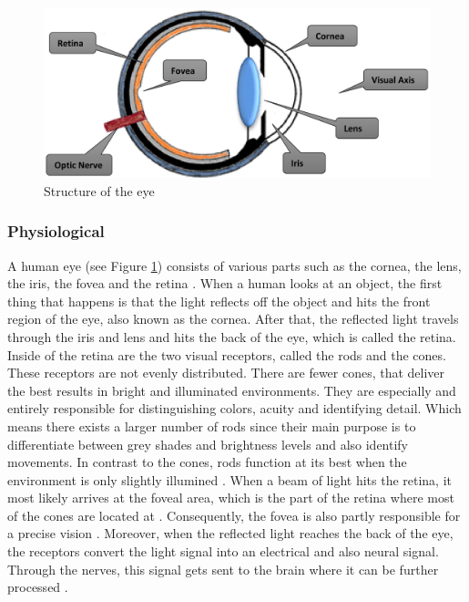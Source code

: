 \begin{figure}[!ht]
    \centering
    \includegraphics[width=0.75\linewidth]{images/Eye_djamasbi2014eye.png}
    \caption{
       Structure of the eye \autocite[38]{djamasbi2014eye}
    }
    \label{figure:Eye}
\end{figure}

\subsubsection{Physiological}
A human eye (see Figure \ref{figure:Eye}) consists of various parts such as the cornea, the lens, the iris, the fovea and the retina \autocite{djamasbi2014eye}. When a human looks at an object, the first thing that happens is that the light reflects off the object and hits the front region of the eye, also known as the cornea. After that, the reflected light travels through the iris and lens and hits the back of the eye, which is called the retina. Inside of the retina are the two visual receptors, called the rods and the cones. These receptors are not evenly distributed. There are fewer cones, that deliver the best results in bright and illuminated environments. They are especially and entirely responsible for distinguishing colors, acuity and identifying detail. Which means there exists a larger number of rods since their main purpose is to differentiate between grey shades and brightness levels and also identify movements. In contrast to the cones, rods function at its best when the environment is only slightly illumined \autocite{djamasbi2014eye, biedert2010eyebook}.
When a beam of light hits the retina, it most likely arrives at the foveal area, which is the part of the retina where most of the cones are located at \autocite{djamasbi2014eye}. Consequently, the fovea is also partly responsible for a precise vision \autocite{biedert2010eyebook}.
Moreover, when the reflected light reaches the back of the eye, the receptors convert the light signal into an electrical and also neural signal. Through the nerves, this signal gets sent to the brain where it can be further processed \autocite{djamasbi2014eye}.

